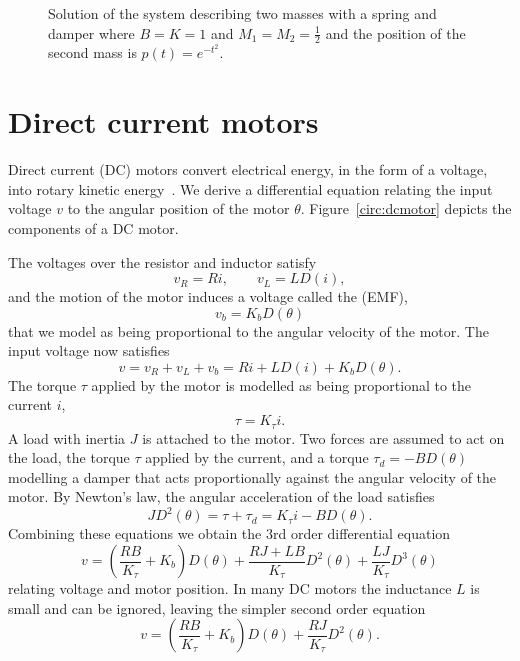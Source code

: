 \begin{figure}[tp]
\centering
{}
\caption{Solution of the system describing two masses with a spring and damper where $B=K=1$ and $M_1=M_2=\tfrac{1}{2}$ and the position of the second mass is $p(t) = e^{-t^2}$.} \label{fig:masspringdampertwosol1}
\end{figure}



\section{Direct current motors}\label{sec:direct-curr-motors}

Direct current (DC) motors convert electrical energy, in the form of a voltage, into rotary kinetic energy~\citep[page 76]{Nise_control_theory_5th}.  We derive a differential equation relating the input voltage $v$ to the angular position of the motor $\theta$.  Figure~\ref{circ:dcmotor} depicts the components of a DC motor. 

The voltages over the resistor and inductor satisfy
\[
v_R = R i, \qquad v_L = L D(i),
\]
and the motion of the motor induces a voltage called the  (EMF),
\[
v_b = K_b D(\theta) 
\]
that we model as being proportional to the angular velocity of the motor.  The input voltage now satisfies
\[
v = v_R + v_L + v_b = R i + L D(i) + K_bD(\theta).
\]
The torque $\tau$ applied by the motor is modelled as being proportional to the current $i$,
\[
\tau = K_\tau i.
\]
A load with inertia $J$ is attached to the motor.  Two forces are assumed to act on the load, the torque $\tau$ applied by the current, and a torque $\tau_d = -B D(\theta)$ modelling a damper that acts proportionally against the angular velocity of the motor.  By Newton's law, the angular acceleration of the load satisfies
\[
J D^2(\theta) = \tau + \tau_d = K_\tau i - B D(\theta).
\]
Combining these equations we obtain the $3$rd order differential equation
\[
v =  \left(\frac{RB}{K_\tau} + K_b\right) D(\theta) + \frac{RJ + LB}{K_\tau} D^2(\theta) + \frac{LJ}{K_\tau} D^3(\theta)
\]
relating voltage and motor position.  In many DC motors the inductance $L$ is small and can be ignored, leaving the simpler second order equation
\begin{equation}\label{eq:dcmotordiffequation}
v = \left(\frac{RB}{K_\tau} + K_b\right) D(\theta) + \frac{RJ}{K_\tau} D^2(\theta).
\end{equation}

